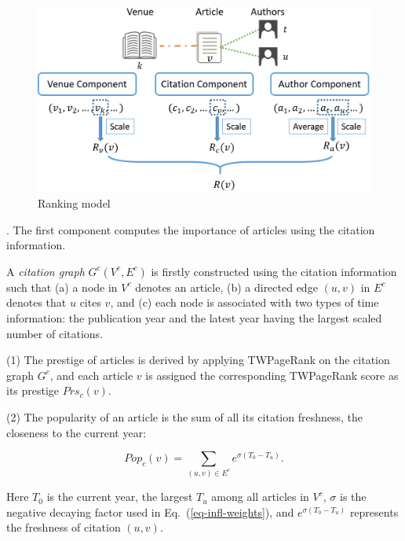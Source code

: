 \begin{figure}[tb!]
\centering
\includegraphics[scale=0.35]{fig/example-ranking.eps}
\vspace{-1ex}
\caption{\small Ranking model \ensemblerank} \label{fig-rankmodel}
\vspace{-3ex}
\end{figure}

.
The first component computes the importance of articles using the citation information.

A {\em citation graph} $G^c(V^c, E^c)$ is firstly constructed using the citation information such that (a) a node in $V^c$ denotes an article, (b) a directed edge $(u,v)$ in $E^c$ denotes that $u$ cites $v$, and (c) each node is associated with two types of time information: the publication year and the latest year having the largest scaled number of citations.


\sstab(1) The prestige of articles is derived by applying TWPageRank on the citation graph $G^c$, and each article $v$ is assigned the corresponding TWPageRank score as its prestige $Prs_c(v)$.

\sstab(2)  The popularity of an article is the sum of all its citation freshness, \ie the closeness to the current year:

\vspace{-1ex}
\begin{small}
\begin{equation}\label{eq-pop}
Pop_c(v) = \sum_{{(u,v)\in E^c}} {e^{\sigma (T_0-T_u)}}.
\end{equation}
\end{small}
\noindent
Here $T_0$ is the current year, \ie the largest $T_u$ among all articles in $V^c$, $\sigma$ is the negative decaying factor used in Eq.~(\ref{eq-infl-weights}), and $e^{\sigma (T_0-T_u)}$ represents the freshness of citation $(u,v)$.

